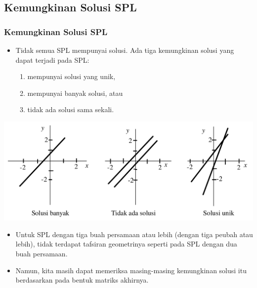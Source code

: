 \documentclass[pdflatex,compress,mathserif]{beamer}
\begin{document}
\subsection{Kemungkinan Solusi SPL}

\begin{frame}
	\frametitle{Kemungkinan Solusi SPL}
	\begin{itemize}
		\item Tidak semua SPL mempunyai solusi. Ada tiga kemungkinan solusi yang dapat terjadi pada SPL:
		\begin{enumerate}
			\item mempunyai solusi yang unik,
			\item mempunyai banyak solusi, atau
			\item tidak ada solusi sama sekali.
		\end{enumerate}
	\end{itemize}
	\begin{center}
		\includegraphics[width=0.9\linewidth]{img/img01}
	\end{center}
\end{frame}

\begin{frame}
	\begin{itemize}
		\item Untuk SPL dengan tiga buah persamaan atau lebih (dengan tiga peubah atau lebih), tidak terdapat tafsiran geometrinya seperti pada SPL dengan dua buah persamaan.
		\item Namun, kita masih dapat memeriksa masing-masing kemungkinan solusi itu berdasarkan pada bentuk matriks akhirnya.
	\end{itemize}
\end{frame}
\end{document}

